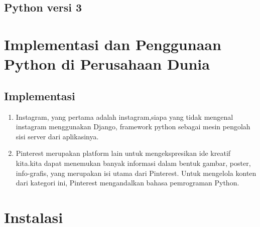 \documentclass{article}
\begin{document}
\subsection{Python versi 3}
\usepackage{Python 3 ini diharapkan sebagai Python masa depan dan merupakan versi yang tulisan yang akan dibuat ini  masih aktif dikembangkan. Python 3 sendiri merupakan versi dengan banyak perubahan/modifikasi yang telah dirilis di akhir tahun 2008.Python 3 sendiri fokus untuk melakukan perapian pada codebase dan menghapuskan duplikasi (redundancy). Perubahan terbesar pada Python 3 termasuk memasukkan statemen print ke dalam built-in function.}
\section{Implementasi dan Penggunaan Python di Perusahaan Dunia}
\usepackage{Membicarakan bahasa pemrograman yang populer, tampaknya kita tak bisa lepas dari bahasa pemrograman Python.Bahasa pemrograman python pun kini telah dikenal oleh developer Indonesia. Bahasa Pemrograman Python, kini bahkan menempati posisi keempat bahasa pemrograman populer versi Tiobe Index.}
\subsection{Implementasi}
\usepackage{kali saya akan mengambil contoh beberapa platform yang menggunakan python dalam alisis data yaitu instagram dan pinterest sebagai berikut }
\begin{enumerate}
    \item Instagram, yang pertama adalah instagram,siapa yang tidak mengenal instagram menggunakan Django, framework python sebagai mesin pengolah sisi server dari aplikasinya.
    \item Pinterest merupakan platform lain untuk mengekspresikan ide kreatif kita.kita dapat menemukan banyak informasi dalam bentuk gambar, poster, info-grafis, yang merupakan isi utama dari Pinterest. Untuk mengelola konten dari kategori ini, Pinterest mengandalkan bahasa pemrograman Python.
\end{enumerate}
\section{Instalasi}
\end{document}
